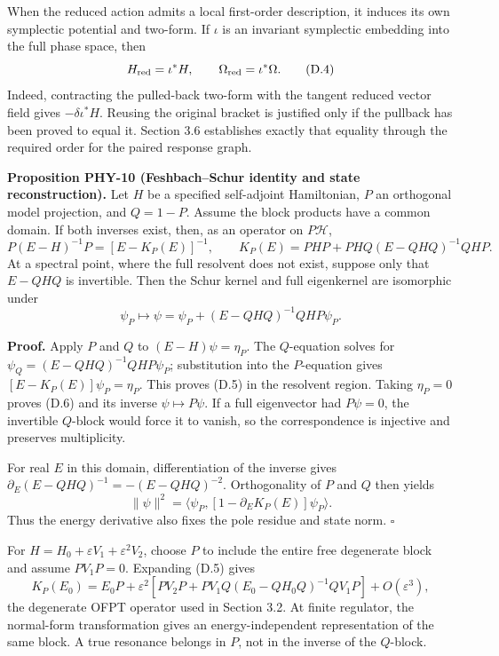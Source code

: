 When the reduced action admits a local first-order description, it induces its own symplectic potential and two-form. If \(\iota\) is an invariant symplectic embedding into the full phase space, then \[
H_{\rm red}=\iota^*H,\qquad \Omega_{\rm red}=\iota^*\Omega.
\tag{D.4}
\] Indeed, contracting the pulled-back two-form with the tangent reduced vector field gives \(-\delta\iota^*H\). Reusing the original bracket is justified only if the pullback has been proved to equal it. Section 3.6 establishes exactly that equality through the required order for the paired response graph.

\textbf{Proposition PHY-10 (Feshbach--Schur identity and state reconstruction).} Let \(H\) be a specified self-adjoint Hamiltonian, \(P\) an orthogonal model projection, and \(Q=1-P\). Assume the block products have a common domain. If both inverses exist, then, as an operator on \(P\mathcal H\), \[
P(E-H)^{-1}P=[E-K_P(E)]^{-1},
\qquad
K_P(E)=PHP+PHQ(E-QHQ)^{-1}QHP.
\tag{D.5}
\] At a spectral point, where the full resolvent does not exist, suppose only that \(E-QHQ\) is invertible. Then the Schur kernel and full eigenkernel are isomorphic under \[
\psi_P\longmapsto
\psi=\psi_P+(E-QHQ)^{-1}QHP\psi_P.
\tag{D.6}
\]

\textbf{Proof.} Apply \(P\) and \(Q\) to \((E-H)\psi=\eta_P\). The \(Q\)-equation solves for \(\psi_Q=(E-QHQ)^{-1}QHP\psi_P\); substitution into the \(P\)-equation gives \([E-K_P(E)]\psi_P=\eta_P\). This proves (D.5) in the resolvent region. Taking \(\eta_P=0\) proves (D.6) and its inverse \(\psi\mapsto P\psi\). If a full eigenvector had \(P\psi=0\), the invertible \(Q\)-block would force it to vanish, so the correspondence is injective and preserves multiplicity.

For real \(E\) in this domain, differentiation of the inverse gives \(\partial_E(E-QHQ)^{-1}=-(E-QHQ)^{-2}\). Orthogonality of \(P\) and \(Q\) then yields \[
\|\psi\|^2
=\langle\psi_P,[1-\partial_EK_P(E)]\psi_P\rangle.
\tag{D.7}
\] Thus the energy derivative also fixes the pole residue and state norm. \(\square\)

For \(H=H_0+\varepsilon V_1+\varepsilon^2V_2\), choose \(P\) to include the entire free degenerate block and assume \(PV_1P=0\). Expanding (D.5) gives \[
K_P(E_0)=E_0P+\varepsilon^2
\left[PV_2P+PV_1Q(E_0-QH_0Q)^{-1}QV_1P\right]
+O(\varepsilon^3),
\tag{D.8}
\] the degenerate OFPT operator used in Section 3.2. At finite regulator, the normal-form transformation gives an energy-independent representation of the same block. A true resonance belongs in \(P\), not in the inverse of the \(Q\)-block.

